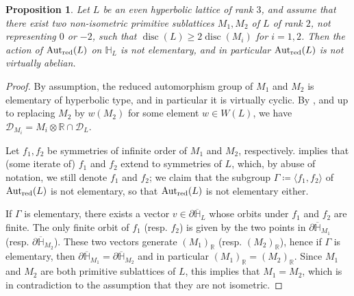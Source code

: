 \documentclass[11pt,letterpaper]{amsart}
\DeclareMathOperator{\Aut}{Aut}
\DeclareMathOperator{\disc}{disc}
\newcommand{\RR}{\mathbb{R}}
\newcommand{\AutredL}{\Aut_{\rm red}(L)}
\newcommand{\D}{\mathcal{D}}
\newtheorem{proposition}[theorem]{Proposition}
\theoremstyle{definition}
\theoremstyle{remark}
\begin{document}
\begin{proposition}\label{prop:rank2sublattice}
Let $L$ be an even hyperbolic lattice of rank $3$, and assume that there exist two \emph{non-isometric} primitive sublattices $M_1,M_2$ of $L$ of rank $2$, not representing $0$ or $-2$, such that $\disc(L)\ge 2\disc(M_i)$ for $i=1,2$. Then the action of $\AutredL$ on $\mathbb{H}_L$ is not elementary, and in particular $\AutredL$ is not virtually abelian.
\end{proposition}
\begin{proof}
By assumption, the reduced automorphism group of $M_1$ and $M_2$ is elementary of hyperbolic type, and in particular it is virtually cyclic. By , and up to replacing $M_2$ by $w(M_2)$ for some element $w \in W(L)$, we have $\D_{M_i} = M_i \otimes \RR \cap \D_{L}$.

Let $f_1,f_2$ be symmetries of infinite order of $M_1$ and $M_2$, respectively.  implies that (some iterate of) $f_1$ and $f_2$ extend to symmetries of $L$, which, by abuse of notation, we still denote $f_1$ and $f_2$; we claim that the subgroup $\Gamma \coloneqq \langle f_1,f_2\rangle$ of $\AutredL$ is not elementary, so that $\AutredL$ is not elementary either.

If $\Gamma$ is elementary, there exists a vector $v\in \partial \overline{\mathbb{H}}_L$ whose orbits under $f_1$ and $f_2$ are finite. The only finite orbit of $f_1$ (resp. $f_2$) is given by the two points in $\partial \overline{\mathbb{H}}_{M_1}$ (resp. $\partial \overline{\mathbb{H}}_{M_2}$). These two vectors generate $(M_1)_\RR$ (resp. $(M_2)_\RR$), hence if $\Gamma$ is elementary, then $\partial \overline{\mathbb{H}}_{M_1} = \partial \overline{\mathbb{H}}_{M_2}$ and in particular $(M_1)_\RR = (M_2)_\RR$. Since $M_1$ and $M_2$ are both primitive sublattices of $L$, this implies that $M_1 = M_2$, which is in contradiction to the assumption that they are not isometric.
\end{proof}
\end{document}
